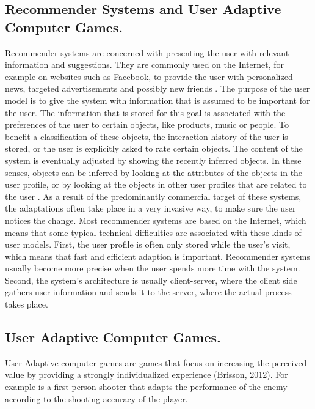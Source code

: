 \subsection{Recommender Systems and User Adaptive Computer Games.}

Recommender systems are concerned with presenting the user with relevant
information and suggestions. They are commonly used on the Internet, for example
on websites such as Facebook, to provide the user with personalized news,
targeted advertisements and possibly new friends \cite{brun2010compass}. The
purpose of the user model is to give the system with information that is assumed
to be important for the user. The information that is stored for this goal is
associated with the preferences of the user to certain objects, like products,
music or people. To benefit a classification of these objects, the interaction
history of the user is stored, or the user is explicitly asked to rate certain
objects. The content of the system is eventually adjusted by showing the
recently inferred objects. In these senses, objects can be inferred by looking
at the attributes of the objects in the user profile, or by looking at the
objects in other user profiles that are related to the user \cite{kobsa2001generic}
\cite{kay2012coming}.  As a result of the predominantly commercial target of these
systems, the adaptations often take place in a very invasive way, to make sure
the user notices the change. Most recommender systems are based on the Internet,
which means that some typical technical difficulties  are associated with these
kinds of user models. First, the user profile is often only stored while the
user’s visit,  which means that fast and efficient adaption is important.
Recommender systems usually become more precise  when the user spends more time
with the system. Second, the system’s architecture is usually client-server,
where the client side gathers user information and sends it to the server, where
the  actual process takes place.

\subsection{User Adaptive Computer Games.}

User Adaptive computer games are games that focus on increasing the perceived
value by providing a strongly individualized experience (Brisson, 2012).  For
example is a first‐person shooter that adapts the performance of the enemy
according to the shooting accuracy of the player.


